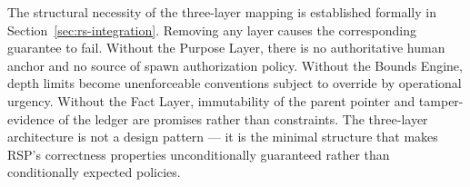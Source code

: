 The structural necessity of the three-layer mapping is established formally in Section~\ref{sec:rs-integration}. Removing any layer causes the corresponding guarantee to fail. Without the Purpose Layer, there is no authoritative human anchor and no source of spawn authorization policy. Without the Bounds Engine, depth limits become unenforceable conventions subject to override by operational urgency. Without the Fact Layer, immutability of the parent pointer and tamper-evidence of the ledger are promises rather than constraints. The three-layer architecture is not a design pattern --- it is the minimal structure that makes RSP's correctness properties unconditionally guaranteed rather than conditionally expected policies.
